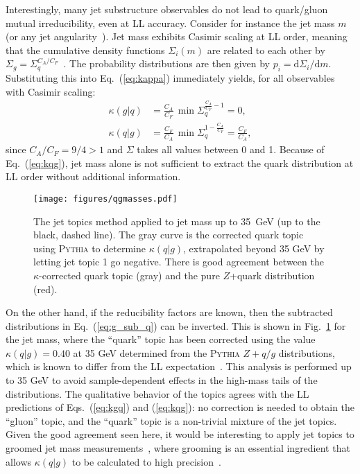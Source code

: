 \documentclass[aps,prl,floatfix,preprintnumbers,twocolumn,groupedaddress,nofootinbib,longbibliography]{revtex4-1}
\DeclareRobustCommand{\Fig}[1]{Fig.~\ref{#1}}
\DeclareRobustCommand{\Eq}[1]{Eq.~(\ref{#1})}
\DeclareRobustCommand{\Eqs}[2]{Eqs.~(\ref{#1}) and (\ref{#2})}
\begin{document}
Interestingly, many jet substructure observables do not lead to quark/gluon mutual irreducibility, even at LL accuracy.
%
Consider for instance the jet mass $m$ (or any jet angularity~\cite{Berger:2003iw,Almeida:2008yp,Ellis:2010rwa}).
%
Jet mass exhibits Casimir scaling at LL order, meaning that the cumulative density functions $\Sigma_i(m)$ are related to each other by $\Sigma_g = \Sigma_q^{C_A/C_F}$~\cite{Larkoski:2013eya,Larkoski:2014pca}.
%
The probability distributions are then given by $p_i = \text{d} \Sigma_i / \text{d} m$.
%
Substituting this into \Eq{eq:kappa} immediately yields, for all observables with Casimir scaling:
%
\begin{align}
\label{eq:kgq}\kappa(g|q) &= \frac{C_A}{C_F}\, \min \Sigma_q^{\frac{C_A}{C_F} - 1} = 0,\\
\label{eq:kqg}\kappa(q|g) &= \frac{C_F}{C_A}\, \min \Sigma_q^{1 - \frac{C_A}{C_F}} = \frac{C_F}{C_A},
\end{align}
since $C_A/C_F = 9/4 > 1$ and $\Sigma$ takes all values between 0 and 1.
%
Because of \Eq{eq:kqg}, jet mass alone is not sufficient to extract the quark distribution at LL order without additional information.

\begin{figure}[t]
\centering
\texttt{[image: figures/qgmasses.pdf]}
\caption{The jet topics method applied to jet mass up to 35~GeV (up to the black, dashed line).  The gray curve is the corrected quark topic using \textsc{Pythia} to determine $\kappa(q|g)$, extrapolated beyond 35 GeV by letting jet topic 1 go negative.  There is good agreement between the $\kappa$-corrected quark topic (gray) and the pure $Z$+quark distribution (red).}
\label{fig:mass}
\end{figure}


On the other hand, if the reducibility factors are known, then the subtracted distributions in \Eq{eq:g_sub_q} can be inverted.
%
This is shown in \Fig{fig:mass} for the jet mass, where the ``quark'' topic has been corrected using the value $\kappa(q|g) = 0.40$ at 35 GeV determined from the \textsc{Pythia} $Z+q/g$ distributions, which is known to differ from the LL expectation~\cite{Gras:2017jty}.
%
This analysis is performed up to 35 GeV to avoid sample-dependent effects in the high-mass tails of the distributions.
%
The qualitative behavior of the topics agrees with the LL predictions of \Eqs{eq:kgq}{eq:kqg}: no correction is needed to obtain the ``gluon'' topic, and the ``quark'' topic is a non-trivial mixture of the jet topics.
%
Given the good agreement seen here, it would be interesting to apply jet topics to groomed jet mass measurements~\cite{Aaboud:2017qwh,CMS-PAS-SMP-16-010}, where grooming is an essential ingredient that allows $\kappa(q|g)$ to be calculated to high precision~\cite{Frye:2016okc,Frye:2016aiz,Marzani:2017mva,Marzani:2017kqd}.
\end{document}
